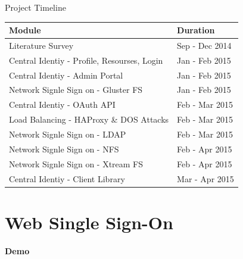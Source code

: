 \documentclass[10pt,xcolor=dvipsnames]{beamer}
\begin{document}
\begin{frame}{Project Timeline}
\begin{table}[H]
		
		\begin{tabular}{ | l | l |}
			\hline 
			\textbf{Module} & \textbf{Duration} \\
			\hline 
			Literature Survey   & Sep - Dec 2014 \\			
			\hline 
			Central Identiy - Profile, Resourses, Login  & Jan - Feb 2015 \\
			\hline
			Central Identiy - Admin Portal & Jan - Feb 2015  \\
			\hline
			Network Signle Sign on  - Gluster FS & Jan - Feb 2015 \\
			\hline
			Central Identiy - OAuth API & Feb - Mar 2015 \\
			\hline
			Load Balancing - HAProxy \& DOS Attacks & Feb - Mar 2015 \\
			\hline
			Network Signle Sign on  - LDAP & Feb - Mar 2015 \\	
			\hline
			Network Signle Sign on  - NFS & Feb - Apr 2015 \\		
			\hline
			Network Signle Sign on  - Xtream FS & Feb - Apr 2015 \\	
			\hline
			Central Identiy - Client Library & Mar - Apr 2015 \\
			\hline 
		\end{tabular}
		
	\end{table}
\end{frame}
\section{Web Single Sign-On}

\begin{frame}
\begin{center}
\textbf{Demo}
\end{center}
\end{frame}
\end{document}
